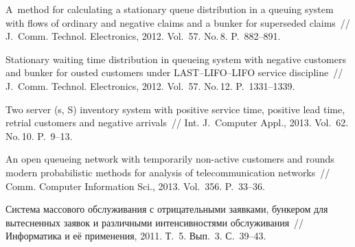 \begin{multicols}{2}
{{\begin{thebibliography}{9}
 A~method for calculating a
stationary queue distribution in a queuing system with flows of
ordinary and negative claims and a bunker for superseded claims~//
J.~Comm. Technol. Electronics, 2012. Vol.~57.
No.\,8. P.~882--891.

 Stationary waiting time
distribution in queueing system with negative customers and bunker
for ousted customers under LAST--LIFO--LIFO service discipline~//
J.~Comm. Technol. Electronics, 2012. Vol.~57.
No.\,12. P.~1331--1339.

 Two server
(s, S) inventory system with positive service time, positive lead
time, retrial customers and negative arrivals~// Int.
J.~Computer Appl., 2013. Vol.~62. No.\,10. P.~9--13.

 An open queueing network with
temporarily non-active customers and rounds modern probabilistic
methods for analysis of telecommunication networks~// Comm. Computer Information Sci., 2013. Vol.~356. P.~33--36.



\label{end\stat}

 Система массового обслуживания с отрицательными
заявками, бункером для вытесненных заявок и различными
интенсивностями обслуживания~// Информатика и её применения, 2011.
Т.~5. Вып.~3. С.~39--43.
\end{thebibliography}
}
}

\end{multicols}